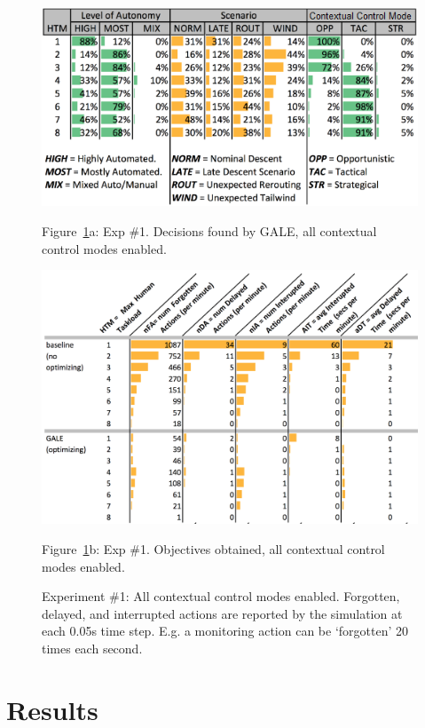 \documentclass[journal]{IEEEtran}
\newcommand{\fig}[1]{Figure~\ref{fig:#1}}
\begin{document}
\begin{figure}
\begin{center}

\includegraphics[width=4.5in]{figures/GALE,decisions,Opp}

\fig{all}a:  Exp \#1. Decisions found by GALE,  all contextual control modes enabled.

\includegraphics[width=5.25in]{figures/objectives,Opp}

\fig{all}b: Exp \#1.  Objectives obtained, all contextual control modes enabled.
\end{center}

\caption{Experiment \#1: All contextual control modes enabled. 
Forgotten, delayed, and interrupted actions are reported by the simulation at each 0.05s time step.  
E.g. a monitoring action can be `forgotten' 20 times each second.  }\label{fig:all}
\end{figure}

\section{Results}
\end{document}
